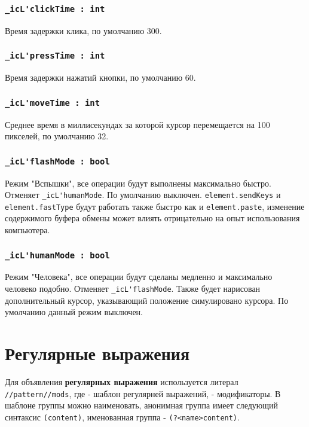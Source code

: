\documentclass[a4paper, 14pt]{extarticle}
\begin{document}
\subsubsection{\lstinline|_icL'clickTime : int|}

Время задержки клика, по умолчанию 300.

\subsubsection{\lstinline|_icL'pressTime : int|}

Время задержки нажатий кнопки, по умолчанию 60.

\subsubsection{\lstinline|_icL'moveTime : int|}

Среднее время в миллисекундах за которой курсор перемещается на 100 пикселей, по умолчанию 32.

\subsubsection{\lstinline|_icL'flashMode : bool|}

Режим "Вспышки", все операции будут выполнены максимально быстро. Отменяет \lstinline|_icL'humanMode|. По умолчанию выключен. \lstinline|element.sendKeys| и \lstinline|element.fastType| будут работать также быстро как и \lstinline|element.paste|, изменение содержимого буфера обмены может влиять отрицательно на опыт использования компьютера.

\subsubsection{\lstinline|_icL'humanMode : bool|}

Режим "Человека", все операции будут сделаны медленно и максимально человеко подобно. Отменяет \lstinline|_icL'flashMode|. Также будет нарисован дополнительный курсор, указывающий положение симулировано курсора. По умолчанию данный режим выключен.

\section{Регулярные выражения}
\label{regex}

Для объявления {\bf регулярных выражения} используется литерал \lstinline|//pattern//mods|, где  - шаблон регулярней выражений,  - модификаторы. В шаблоне группы можно наименовать, анонимная группа имеет следующий синтаксис \lstinline|(content)|, именованная группа - \lstinline|(?<name>content)|.
\end{document}
